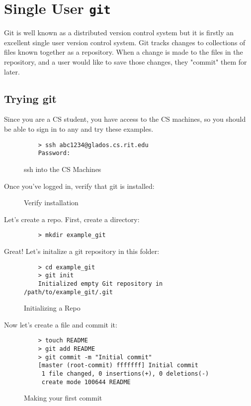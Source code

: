 \documentclass[11pt]{report}
\begin{document}
\chapter{Single User \texttt{git}}
Git is well known as a distributed version control system but it is
firstly an excellent single user version control system. 
Git tracks changes to collections of files known together as a repository.
When a change is made to the files in the repository, and a user would like
to save those changes, they "commit" them for later.

\section{Trying git}
Since you are a CS student,
you have access to the CS machines, so you should be able to sign in to any and
try these examples.

\begin{figure}[H]
  \caption{ssh into the CS Machines}
  \begin{lstlisting}
    > ssh abc1234@glados.cs.rit.edu
    Password:
  \end{lstlisting}
\end{figure}

Once you've logged in, verify that git is installed:

\begin{figure}[H]\end{figure}
\begin{figure}[H]\caption{Verify installation}\end{figure}

Let's create a repo. First, create a directory:
\begin{figure}[H]
  \begin{lstlisting}
    > mkdir example_git
  \end{lstlisting}
\end{figure}

Great! Let's initalize a git repository in this folder:
\begin{figure}[H]
  \caption{Initializing a Repo}
  \begin{lstlisting}
    > cd example_git
    > git init
    Initialized empty Git repository in /path/to/example_git/.git
  \end{lstlisting}
\end{figure}

Now let's create a file and commit it:
\begin{figure}[H]
  \caption{Making your first commit}
  \begin{lstlisting}
    > touch README
    > git add README
    > git commit -m "Initial commit"
    [master (root-commit) fffffff] Initial commit
     1 file changed, 0 insertions(+), 0 deletions(-)
     create mode 100644 README
  \end{lstlisting}
\end{figure}
\end{document}
